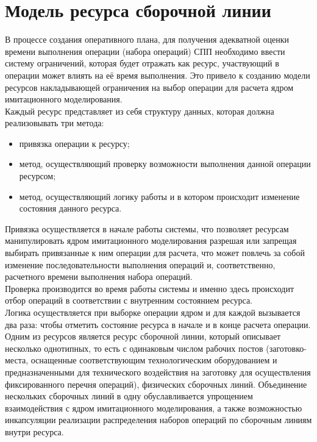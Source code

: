 \section{Модель ресурса сборочной линии}
\indent В процессе создания оперативного плана, для получения адекватной оценки времени выполнения операции (набора операций) СПП необходимо ввести систему ограничений, которая будет отражать как ресурс, участвующий в операции может влиять на её время выполнения.
Это привело к созданию модели ресурсов накладывающей ограничения на выбор операции для расчета ядром имитационного моделирования.\\
\indent Каждый ресурс представляет из себя структуру данных, которая должна реализовывать три метода:

\begin{itemize}
	\item привязка операции к ресурсу;
	\item метод, осуществляющий проверку возможности выполнения данной операции ресурсом;
	\item метод, осуществляющий логику работы и в котором происходит изменение состояния данного ресурса.
\end{itemize}

\indent Привязка осуществляется в начале работы системы, что позволяет ресурсам манипулировать ядром имитационного моделирования разрешая или запрещая выбирать привязанные к ним операции для расчета, что может повлечь за собой изменение последовательности выполнения операций и, соответственно, расчетного времени выполнения набора операций.\\
\indent Проверка производится во время работы системы и именно здесь происходит отбор операций в соответствии с внутренним состоянием ресурса.\\
\indent Логика осуществляется при выборке операции ядром и для каждой вызывается два раза: чтобы отметить состояние ресурса в начале и в конце расчета операции.\\
\indent Одним из ресурсов является ресурс сборочной линии, который описывает несколько однотипных, то есть с одинаковым числом рабочих постов (заготовко-места, оснащенные соответствующим технологическим оборудованием и предназначенными для технического воздействия на заготовку для осуществления фиксированного перечня операций), физических сборочных линий.
Объединение нескольких сборочных линий в одну обуславливается упрощением взаимодействия с ядром имитационного моделирования, а также возможностью инкапсуляции реализации распределения наборов операций по сборочным линиям внутри ресурса.\\

